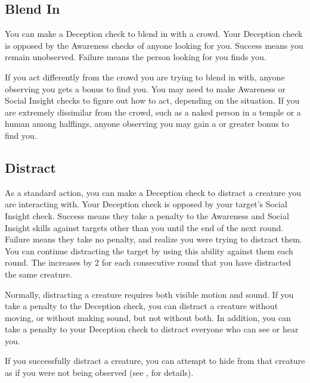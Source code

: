     \subsection{Blend In}
        You can make a Deception check to blend in with a crowd.
        Your Deception check is opposed by the Awareness checks of anyone looking for you.
        Success means you remain unobserved.
        Failure means the person looking for you finds you.

        If you act differently from the crowd you are trying to blend in with, anyone observing you gets a  bonus to find you. You may need to make Awareness or Social Insight checks to figure out how to act, depending on the situation. If you are extremely dissimilar from the crowd, such as a naked person in a temple or a human among halflings, anyone observing you may gain a  or greater bonus to find you.

    \subsection{Distract}\label{Distract}
        As a standard action, you can make a Deception check to distract a creature you are interacting with.
        Your Deception check is opposed by your target's Social Insight check.
        Success means they take a  penalty to the Awareness and Social Insight skills against targets other than you until the end of the next round.
        Failure means they take no penalty, and realize you were trying to distract them.
        You can continue distracting the target by using this ability against them each round.
        The  increases by 2 for each consecutive round that you have distracted the same creature.

        Normally, distracting a creature requires both visible motion and sound.
        If you take a  penalty to the Deception check, you can distract a creature without moving, or without making sound, but not without both.
        In addition, you can take a  penalty to your Deception check to distract everyone who can see or hear you.

        If you successfully distract a creature, you can attempt to hide from that creature as if you were not being observed (see , for details).

